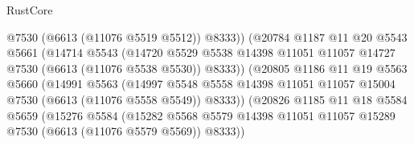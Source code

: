 \begin{lexlean}{RustCore}
\begin{coremodule}
                                    @7530
                                    (@6613 (@11076 @5519 @5512))
                                    @8333))
                                (@20784
                                  @1187
                                  @11
                                  @20
                                  @5543
                                  @5661
                                  (@14714
                                    @5543
                                    (@14720
                                      @5529
                                      @5538
                                      @14398
                                      @11051
                                      @11057
                                      @14727
                                      @7530
                                      (@6613 (@11076 @5538 @5530))
                                      @8333))
                                  (@20805
                                    @1186
                                    @11
                                    @19
                                    @5563
                                    @5660
                                    (@14991
                                      @5563
                                      (@14997
                                        @5548
                                        @5558
                                        @14398
                                        @11051
                                        @11057
                                        @15004
                                        @7530
                                        (@6613 (@11076 @5558 @5549))
                                        @8333))
                                    (@20826
                                      @1185
                                      @11
                                      @18
                                      @5584
                                      @5659
                                      (@15276
                                        @5584
                                        (@15282
                                          @5568
                                          @5579
                                          @14398
                                          @11051
                                          @11057
                                          @15289
                                          @7530
                                          (@6613 (@11076 @5579 @5569))
                                          @8333))

\end{coremodule}
\end{lexlean}
